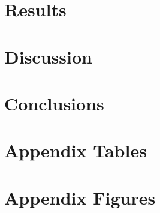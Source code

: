 \documentclass{article}
\begin{document}
\section{Results}\label{sec:results}
    

\section{Discussion}\label{sec:discussion}
	

\section{Conclusions}\label{sec:conclusion}
    

 


\clearpage
\nocite{*}
\printbibliography


\clearpage

\section*{}
\vspace{5mm}

\appendix

\renewcommand\thetable{\thesection.\arabic{table}}    
\renewcommand\thefigure{\thesection.\arabic{figure}} 
\setcounter{table}{0}
\setcounter{figure}{0}

\section{Appendix Tables}
	

\clearpage
\section{Appendix Figures}
	
\end{document}
